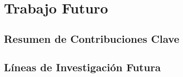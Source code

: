 \chapter{Trabajo Futuro}

\section{Resumen de Contribuciones Clave}

\section{Líneas de Investigación Futura}

